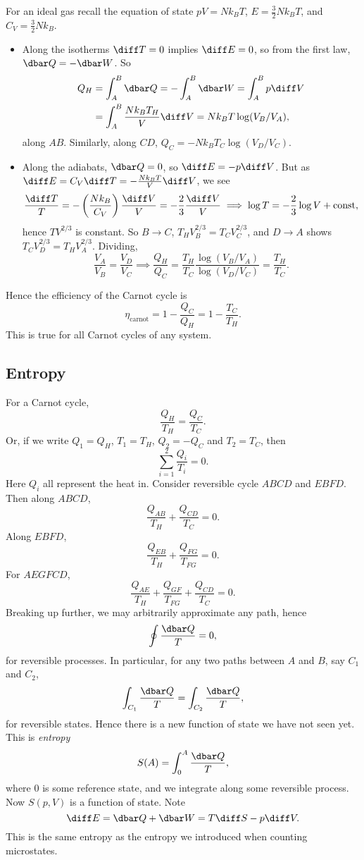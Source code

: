 \documentclass[12pt]{article}
\begin{document}
For an ideal gas recall the equation of state $pV = Nk_B T$, $E = \frac{3}{2} N k_B T$, and $C_V = \frac{3}{2} N k_B$.
\begin{itemize}
	\item Along the isotherms $\diff T = 0$ implies $\diff E = 0$, so from the first law, $\dbar Q = - \dbar W$. So
		\begin{align*}
			Q_H &= \int_A^B \dbar Q = - \int_A^B \dbar W = \int_A^B p \diff V \\
			    &= \int_A^B \frac{N k_B T_H}{V} \diff V = Nk_B T \log(V_B/V_A),
		\end{align*}
		along $AB$. Similarly, along $CD$, $Q_C = - N k_B T_C \log(V_D/V_C)$.
	\item Along the adiabats, $\dbar Q = 0$, so $\diff E = - p \diff V$. But as $\diff E = C_V \diff T = - \frac{Nk_B T}{V} \diff V$, we see
		\[
			\frac{\diff T}{T} = - \left( \frac{Nk_B}{C_V} \right) \frac{\diff V}{V} = - \frac{2}{3} \frac{\diff V}{V} \implies \log T = - \frac{2}{3} \log V + \text{const},
		\]
		hence $T V^{2/3}$ is constant. So $B \to C$, $T_H V_B^{2/3} = T_C V_C^{2/3}$, and $D \to A$ shows $T_C V_D^{2/3} = T_H V_A^{2/3}$. Dividing,
		\[
		\frac{V_A}{V_B} = \frac{V_D}{V_C} \implies \frac{Q_H}{Q_C} = \frac{T_H}{T_C} \frac{\log(V_B/V_A)}{\log(V_D/V_C)} = \frac{T_H}{T_C}.
		\]
\end{itemize}
Hence the efficiency of the Carnot cycle is
\[
\eta_{\mathrm{carnot}} = 1 - \frac{Q_C}{Q_H} = 1 - \frac{T_C}{T_H}.
\]
This is true for all Carnot cycles of any system.

\subsection{Entropy}
\label{thm_ent}

For a Carnot cycle,
\[
\frac{Q_H}{T_H} = \frac{Q_C}{T_C}.
\]
Or, if we write $Q_1 = Q_H$, $T_1 = T_H$, $Q_2 = -Q_C$ and $T_2 = T_C$, then
\[
\sum_{i = 1}^2 \frac{Q_i}{T_i} = 0.
\]
Here $Q_i$ all represent the heat in. Consider reversible cycle $ABCD$ and $EBFD$. Then along $ABCD$,
\[
\frac{Q_{AB}}{T_H} + \frac{Q_{CD}}{T_C} = 0.
\]
Along $EBFD$,
\[
\frac{Q_{EB}}{T_H} + \frac{Q_{FG}}{T_{FG}} = 0.
\]
For $AEGFCD$,
\[
\frac{Q_{AE}}{T_H} + \frac{Q_{GF}}{T_{FG}} + \frac{Q_{CD}}{T_C} = 0.
\]
Breaking up further, we may arbitrarily approximate any path, hence
\[
\oint \frac{\dbar Q}{T} = 0,
\]
for reversible processes. In particular, for any two paths between $A$ and $B$, say $C_1$ and $C_2$,
\[
\int_{C_1} \frac{\dbar Q}{T} = \int_{C_2} \frac{\dbar Q}{T},
\]
for reversible states. Hence there is a new function of state we have not seen yet. This is \emph{entropy}
\[
S(A) = \int_0^{A} \frac{\dbar Q}{T},
\]
where $0$ is some reference state, and we integrate along some reversible process. Now $S(p, V)$ is a function of state. Note
\[
\diff E = \dbar Q + \dbar W = T \diff S - p \diff V.
\]
This is the same entropy as the entropy we introduced when counting microstates.
\end{document}
